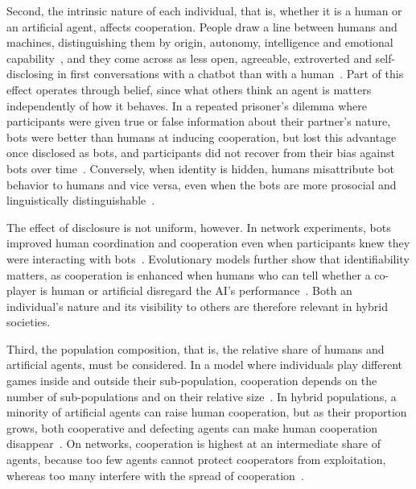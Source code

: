 Second, the intrinsic nature of each individual, that is, whether it is a human or an artificial agent, affects cooperation. People draw a line between humans and machines, distinguishing them by origin, autonomy, intelligence and emotional capability~\cite{guzmanOntologicalBoundariesHumans2020}, and they come across as less open, agreeable, extroverted and self-disclosing in first conversations with a chatbot than with a human~\cite{mouMediaInequalityComparing2017}. Part of this effect operates through belief, since what others think an agent is matters independently of how it behaves. In a repeated prisoner's dilemma where participants were given true or false information about their partner's nature, bots were better than humans at inducing cooperation, but lost this advantage once disclosed as bots, and participants did not recover from their bias against bots over time~\cite{ishowo-olokoBehaviouralEvidenceTransparency2019}. Conversely, when identity is hidden, humans misattribute bot behavior to humans and vice versa, even when the bots are more prosocial and linguistically distinguishable~\cite{jiangHumansLearnPrefer2025}.

The effect of disclosure is not uniform, however. In network experiments, bots improved human coordination and cooperation even when participants knew they were interacting with bots~\cite{shiradoLocallyNoisyAutonomous2017, shiradoNetworkEngineeringUsing2020}. Evolutionary models further show that identifiability matters, as cooperation is enhanced when humans who can tell whether a co-player is human or artificial disregard the AI's performance~\cite{zimmaroEmergenceCooperationOneshot2024}. Both an individual's nature and its visibility to others are therefore relevant in hybrid societies.


Third, the population composition, that is, the relative share of humans and artificial agents, must be considered. In a model where individuals play different games inside and outside their sub-population, cooperation depends on the number of sub-populations and on their relative size~\cite{huangEffectHeterogeneousSubpopulations2015}. In hybrid populations, a minority of artificial agents can raise human cooperation, but as their proportion grows, both cooperative and defecting agents can make human cooperation disappear~\cite{guoFacilitatingCooperationHumanagent2023}. On networks, cooperation is highest at an intermediate share of agents, because too few agents cannot protect cooperators from exploitation, whereas too many interfere with the spread of cooperation~\cite{fuOptimalIntegrationIntelligent2026}.

